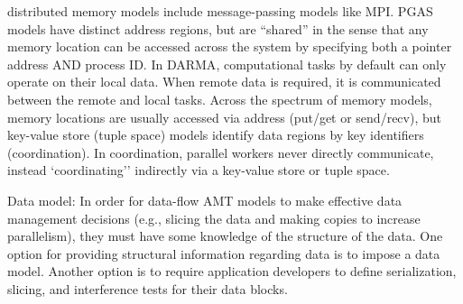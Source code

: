 \begin{compactdesc}
  \Glspl{distributed memory
  model} include message-passing models like MPI. \gls{PGAS} models have distinct address regions,
  but are ``shared'' in the sense that any memory location can be accessed across the system by specifying both a pointer address AND process ID. 
  In \gls{DARMA}, computational tasks by default can only operate on their local data. When remote data
     is required, it is communicated between the remote and local tasks.
    Across the spectrum of memory models, memory locations are usually
    accessed via address (put/get or send/recv), but \gls{key-value store}
    (\gls{tuple space}) models identify data regions by key identifiers (coordination).
    In coordination, parallel workers never directly communicate, instead `coordinating'' indirectly via a \gls{key-value store} or \gls{tuple space}.  
\item[Data model:]
  In order for data-flow \gls{AMT} models to make effective data management
  decisions (e.g., \gls{slicing} the data and making copies to increase
  parallelism), they must have some knowledge of the structure of the data.
  One option for providing structural information regarding data is to impose a
  \gls{data model}.  Another option is to require application developers to define
  \gls{serialization}, \gls{slicing}, and \glspl{interference test} for their data blocks. 
\end{compactdesc}

